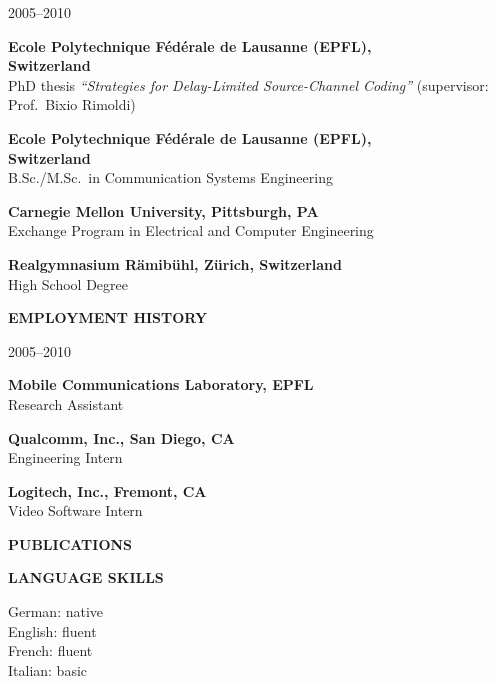 {\raggedright 
\begin{cvlist}{2005--2010}
 \item[2005--2010] \textbf{Ecole Polytechnique F\'ed\'erale de Lausanne (EPFL),}\\ \textbf{Switzerland}\\
    PhD thesis \emph{``Strategies for Delay-Limited Source-Channel Coding''}
    (supervisor: Prof.~Bixio Rimoldi)
 \item[1999--2005] \textbf{Ecole Polytechnique F\'ed\'erale de Lausanne (EPFL),}\\ \textbf{Switzerland}\\
   B.Sc./M.Sc.\ in Communication Systems Engineering
  
 \item[2001--2002]  \textbf{Carnegie Mellon University, Pittsburgh, PA}\\
   Exchange Program in Electrical and Computer Engineering

 \item[1992--1999] \textbf{Realgymnasium R\"amib\"uhl, Z\"urich, Switzerland}\\
   High School Degree
 \end{cvlist}
 

\vspace{\baselineskip}
\noindent\textsf{\textbf{EMPLOYMENT HISTORY}}
\begin{cvlist}{2005--2010}
\item[2005--2010] \textbf{Mobile Communications Laboratory, EPFL}\\Research Assistant

\item[2004--2005] \textbf{Qualcomm, Inc., San Diego, CA}\\
  Engineering Intern

\item[2003] \textbf{Logitech, Inc., Fremont, CA}\\ Video Software Intern
\end{cvlist}


\noindent\textsf{\textbf{PUBLICATIONS}}
\nobreak

{
\renewenvironment{thebibliography}[1]{\begin{enumerate}}{\end{enumerate}}
\renewcommand\bibitem[1]{\item}

}

\vspace{\baselineskip}
\noindent\textsf{\textbf{LANGUAGE SKILLS}}
\vspace{0.5\baselineskip}

\noindent
German: native\\
English: fluent\\
French: fluent\\
Italian: basic

}
